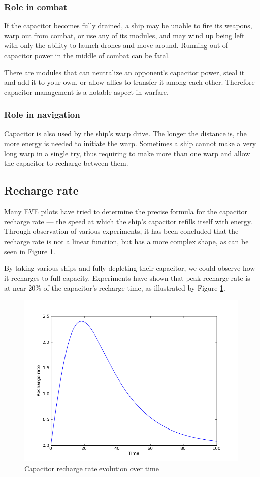 \subsubsection{Role in combat}
If the capacitor becomes fully drained, a ship may be unable to fire its weapons, warp out from combat, or use any of its modules, and may wind up being left with only the ability to launch drones and move around. Running out of capacitor power in the middle of combat can be fatal.

There are modules that can neutralize an opponent's capacitor power, steal it and add it to your own, or allow allies to transfer it among each other. Therefore capacitor management is a notable aspect in warfare. 

\subsubsection{Role in navigation}
Capacitor is also used by the ship's warp drive. The longer the distance is, the more energy is needed to initiate the warp. Sometimes a ship cannot make a very long warp in a single try, thus requiring to make more than one warp and allow the capacitor to recharge between them. 

\subsection{Recharge rate}
Many EVE pilots have tried to determine the precise formula for the capacitor recharge rate --- the speed at which the ship's capacitor refills itself with energy. Through observation of various experiments, it has been concluded that the recharge rate is not a linear function, but has a more complex shape, as can be seen in Figure \ref{fig:ratevstime}.

By taking various ships and fully depleting their capacitor, we could observe how it recharges to full capacity. Experiments have shown that peak recharge rate is at near 20\% of the capacitor’s recharge time, as illustrated by Figure \ref{fig:ratevstime}.

\begin{figure}[h]
\centering
\includegraphics[width=0.7\linewidth]{src/img/ratevstime}
\caption{Capacitor recharge rate evolution over time}
\label{fig:ratevstime}
\end{figure}


